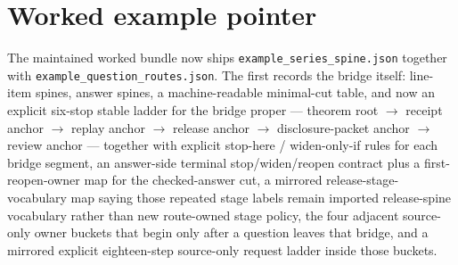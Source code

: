 \documentclass[11pt]{article}
\begin{document}
\section{Worked example pointer}
The maintained worked bundle now ships \nolinkurl{example_series_spine.json} together with \nolinkurl{example_question_routes.json}.\cite{series:workedexample}
The first records the bridge itself: line-item spines, answer spines, a machine-readable minimal-cut table, and now an explicit six-stop stable ladder for the bridge proper --- theorem root $\to$ receipt anchor $\to$ replay anchor $\to$ release anchor $\to$ disclosure-packet anchor $\to$ review anchor --- together with explicit stop-here / widen-only-if rules for each bridge segment, an answer-side terminal stop/widen/reopen contract plus a first-reopen-owner map for the checked-answer cut, a mirrored release-stage-vocabulary map saying those repeated stage labels remain imported release-spine vocabulary rather than new route-owned stage policy, the four adjacent source-only owner buckets that begin only after a question leaves that bridge, and a mirrored explicit eighteen-step source-only request ladder inside those buckets.
\end{document}
